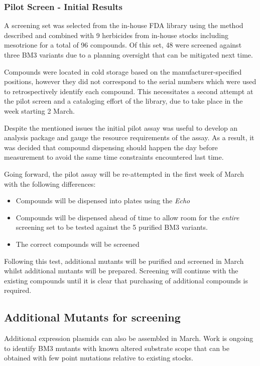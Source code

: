 \documentclass{article}
\begin{document}
\subsubsection{Pilot Screen - Initial Results}
A screening set was selected from the in-house FDA library using the method described and combined with 9 herbicides from in-house stocks including mesotrione for a total of 96 compounds. Of this set, 48 were screened against three BM3 variants due to a planning oversight that can be mitigated next time. %
\par
Compounds were located in cold storage based on the manufacturer-specified positions, however they did not correspond to the serial numbers which were used to retrospectively identify each compound. This necessitates a second attempt at the pilot screen and a cataloging effort of the library, due to take place in the week starting 2 March. %
\par
Despite the mentioned issues the initial pilot assay was useful to develop an analysis package and gauge the resource requirements of the assay. As a result, it was decided that compound dispensing should happen the day before measurement to avoid the same time constraints encountered last time. %
\par
Going forward, the pilot assay will be re-attempted in the first week of March with the following differences: %
\begin{itemize}
	\item Compounds will be dispensed into plates using the \textit{Echo}
	\item Compounds will be dispensed ahead of time to allow room for the \textit{entire} screening set to be tested against the 5 purified BM3 variants.
	\item The correct compounds will be screened
\end{itemize}
\par
Following this test, additional mutants will be purified and screened in March whilst additional mutants will be prepared. Screening will continue with the existing compounds until it is clear that purchasing of additional compounds is required.

\subsection{Additional Mutants for screening}
Additional expression plasmids can also be assembled in March. Work is ongoing to identify BM3 mutants with known altered substrate scope that can be obtained with few point mutations relative to existing stocks.  %
\par
\end{document}
